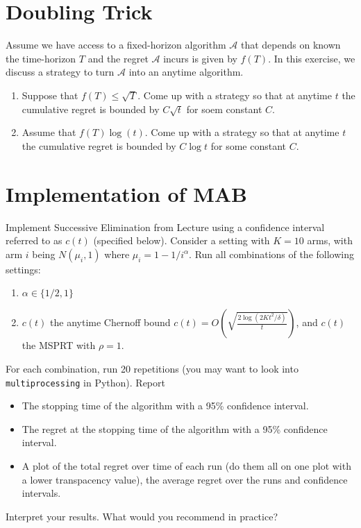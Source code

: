 \documentclass[11pt]{article}
\newcommand{\1}[1]{\mathbf{1}\left\{#1\right\}}
\begin{document}
\section{Doubling Trick}
Assume we have access to a fixed-horizon algorithm $\mathcal{A}$ that depends on known the time-horizon $T$ and the regret $\mathcal{A}$ incurs is given by $f(T)$. In this exercise, we discuss a strategy to turn $\mathcal{A}$ into an anytime algorithm.

\begin{enumerate}
    \item Suppose that $f(T)\leq \sqrt{T}$. Come up with a strategy so that at anytime $t$ the cumulative regret is bounded by $C\sqrt{t}$ for soem constant $C$.
    \item Assume that $f(T) \log(t)$. Come up with a strategy so that at anytime $t$ the cumulative regret is bounded by $C\log{t}$ for some constant $C$.
\end{enumerate}

\section{Implementation of MAB}

Implement Successive Elimination from Lecture using a confidence interval referred to as $c(t)$ (specified below). Consider a setting with $K=10$ arms, with arm $i$ being $N(\mu_i, 1)$ where $\mu_i = 1-1/i^{\alpha}$. Run all combinations of the following settings:
\begin{enumerate}
    \item $\alpha\in \{1/2,1\}$
    \item $c(t)$ the anytime Chernoff bound $c(t) = O\left(\sqrt{\frac{2\log(2Kt^2/\delta)}{t}}\right)$, and $c(t)$ the MSPRT with $\rho=1$.
\end{enumerate}

For each combination, run 20 repetitions (you may want to look into \texttt{multiprocessing} in Python). Report 
\begin{itemize}
    \item The stopping time of the algorithm with a 95\% confidence interval.
    \item The regret at the stopping time of the algorithm with a 95\% confidence interval.
    \item A plot of the total regret over time of each run (do them all on one plot with a lower transpacency value), the average regret over the runs and confidence intervals. 
\end{itemize}
Interpret your results. What would you recommend in practice?
\end{document}
